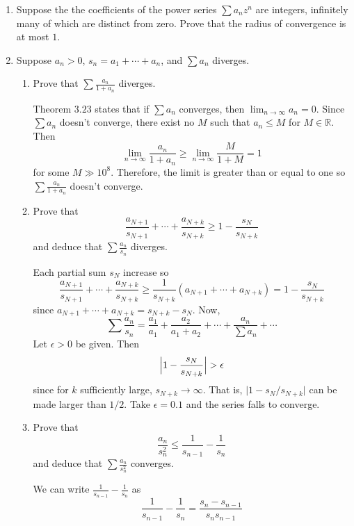 \begin{enumerate}
\begin{enumerate}[label = (\alph*)]
  \end{enumerate}
\item
  Suppose the the coefficients of the power series \(\sum a_nz^n\) are
  integers, infinitely many of which are distinct from zero.
  Prove that the radius of convergence is at most \(1\).
  \par\smallskip
\item
  Suppose \(a_n > 0\), \(s_n = a_1 + \cdots + a_n\), and \(\sum a_n\) diverges.
  \begin{enumerate}[label = (\alph*), ref = \theenumi{} (\alph*)]
  \item
    Prove that \(\sum\frac{a_n}{1 + a_n}\) diverges.
    \par\smallskip
    Theorem \(3.23\) states that if \(\sum a_n\) converges, then
    \(\lim_{n\to\infty}a_n = 0\).
    Since \(\sum a_n\) doesn't converge, there exist no \(M\) such that
    \(a_n\leq M\) for \(M\in\mathbb{R}\).
    Then
    \[
    \lim_{n\to\infty}\frac{a_n}{1 + a_n}\geq
    \lim_{n\to\infty}\frac{M}{1 + M} = 1
    \]
    for some \(M\gg 10^8\).
    Therefore, the limit is greater than or equal to one so
    \(\sum\frac{a_n}{1 + a_n}\) doesn't converge.
  \item
    \label{3.11.b}
    Prove that
    \[
    \frac{a_{N + 1}}{s_{N + 1}} + \cdots + \frac{a_{N + k}}{s_{N + k}}\geq 1
    - \frac{s_N}{s_{N + k}}
    \]
    and deduce that \(\sum\frac{a_n}{s_n}\) diverges.
    \par\smallskip
    Each partial sum \(s_N\) increase so
    \[
    \frac{a_{N + 1}}{s_{N + 1}} + \cdots + \frac{a_{N + k}}{s_{N + k}}\geq
    \frac{1}{s_{N + k}}(a_{N + 1} + \cdots + a_{N + k})  =
    1 - \frac{s_N}{s_{N + k}}
    \]
    since \(a_{N + 1} + \cdots + a_{N + k} = s_{N + k} - s_N\).
    Now,
    \[
    \sum\frac{a_n}{s_n} = \frac{a_1}{a_1} + \frac{a_2}{a_1 + a_2} + \cdots
    + \frac{a_n}{\sum a_n} + \cdots
    \]
    Let \(\epsilon > 0\) be given.
    Then
    \[
    \Bigl\lvert 1 - \frac{s_N}{s_{N + k}}\Bigr\rvert > \epsilon
    \]
    since for \(k\) sufficiently large, \(s_{N + k}\to\infty\).
    That is, \(\lvert 1 - s_N/s_{N + k}\rvert\) can be made larger than
    \(1/2\).
    Take \(\epsilon = 0.1\) and the series falls to converge.
  \item
    Prove that
    \[
    \frac{a_n}{s_n^2}\leq\frac{1}{s_{n - 1}} - \frac{1}{s_n}
    \]
    and deduce that \(\sum\frac{a_n}{s_n^2}\) converges.
    \par\smallskip
    We can write \(\frac{1}{s_{n - 1}} - \frac{1}{s_n}\) as
    \[
    \frac{1}{s_{n - 1}} - \frac{1}{s_n} = \frac{s_n - s_{n - 1}}{s_ns_{n - 1}}
\]
\end{enumerate}
\end{enumerate}
